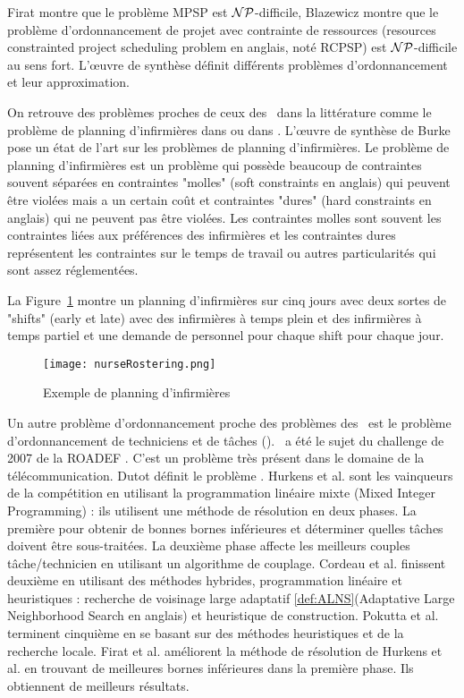 Firat \cite{Firat2012} montre que le problème MPSP est $\mathcal{NP}$-difficile, Blazewicz \cite{Blazewicz1983} montre que le problème d'ordonnancement de projet avec contrainte de ressources (resources constrainted project scheduling problem en anglais, noté RCPSP) est $\mathcal{NP}$-difficile au sens fort. L’œuvre de synthèse  \cite{Graham1979} définit différents problèmes d'ordonnancement et leur approximation.

On retrouve des problèmes proches de ceux des \wsrp ~dans la littérature comme le problème de planning d'infirmières dans \cite{Trilling2007} ou dans \cite{Burke2010}.
L’œuvre de synthèse de Burke \cite{burke2004state} pose un état de l'art sur les problèmes de planning d'infirmières.
Le problème de planning d'infirmières est un problème qui possède beaucoup de contraintes souvent séparées en contraintes "molles" (soft constraints en anglais) qui peuvent être violées mais a un certain coût et contraintes "dures" (hard constraints en anglais) qui ne peuvent pas être violées. 
Les contraintes molles sont souvent les contraintes liées aux préférences des infirmières et les contraintes dures représentent les contraintes sur le temps de travail ou autres particularités qui sont assez réglementées.

La Figure~\ref{nurseRostering} montre un planning d'infirmières sur cinq jours avec deux sortes de "shifts" (early et late) avec des infirmières à temps plein et des infirmières à temps partiel et une demande de personnel pour chaque shift pour chaque jour.


\begin{figure}[H]
\centering
\texttt{[image: nurseRostering.png]}
\caption{Exemple de planning d'infirmières\label{nurseRostering}}
\end{figure}

Un autre problème d'ordonnancement proche des problèmes des \wsrp ~est le problème d'ordonnancement de techniciens et de tâches (\ttsp). \ttsp ~a été le sujet du challenge de 2007 de la ROADEF \cite{Cordeau2010,Pokutta2009,Hurkens2009}.
C'est un problème très présent dans le domaine de la télécommunication.
Dutot \cite{dutot2006technicians} définit le problème \ttsp. 
Hurkens et al.\cite{Hurkens2009} sont les vainqueurs de la compétition en utilisant la programmation linéaire mixte (Mixed Integer Programming) : ils utilisent une méthode de résolution en deux phases. 
La première pour obtenir de bonnes bornes inférieures et déterminer quelles tâches doivent être sous-traitées. 
La deuxième phase affecte les meilleurs couples tâche/technicien  en utilisant un algorithme de couplage.
Cordeau et al.\cite{Cordeau2010} finissent deuxième en utilisant des méthodes hybrides, programmation linéaire et heuristiques : recherche de voisinage large adaptatif \ref{def:ALNS}(Adaptative Large Neighborhood Search en anglais) et heuristique de construction.
Pokutta et al.\cite{Pokutta2009} terminent cinquième en se basant sur des méthodes heuristiques et de la recherche locale. 
Firat et al.\cite{Firat2012} améliorent la méthode de résolution de Hurkens et al.\cite{Hurkens2009} en trouvant de meilleures bornes inférieures dans la première phase. Ils obtiennent de meilleurs résultats. 


